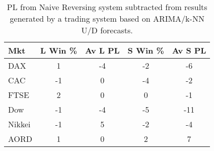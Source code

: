 \begin{table}[ht]
\centering
\caption[ARIMA/k-NN U/D system results minus Naive Reversing results]{PL from Naive Reversing system subtracted from results generated by a trading system based on ARIMA/k-NN U/D forecasts.} 
\label{tab:chp_ts:pUD_CAT_arima_knn_sys_diff}
\begin{tabular}{lcccc}
  \toprule Mkt & L Win \% & Av L PL & S Win \% & Av S PL \\ 
  \midrule DAX & 1 & -4 & -2 & -6 \\ 
  CAC & -1 & 0 & -4 & -2 \\ 
  FTSE & 2 & 0 & 0 & -1 \\ 
  Dow & -1 & -4 & -5 & -11 \\ 
  Nikkei & -1 & 5 & -2 & -4 \\ 
  AORD & 1 & 0 & 2 & 7 \\ 
   \bottomrule \end{tabular}
\end{table}
